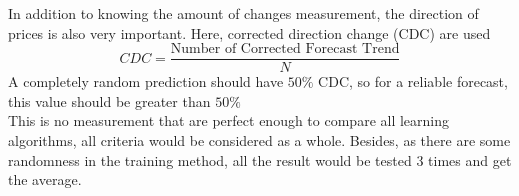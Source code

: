 In addition to knowing the amount of changes measurement, the direction of prices is also very important. Here, corrected direction change (CDC)\cite{naeini2010stock} are used
\begin{equation}
CDC = \frac{\text{Number of Corrected Forecast Trend}}{N}
\end{equation}
A completely random prediction should have $ 50\% $ CDC, so for a reliable forecast, this value should be greater than $ 50\% $\\


This is no measurement that are perfect enough to compare all learning algorithms, all criteria would be considered as a whole. Besides, as there are some randomness in the training method, all the result would be tested 3 times and get the average.